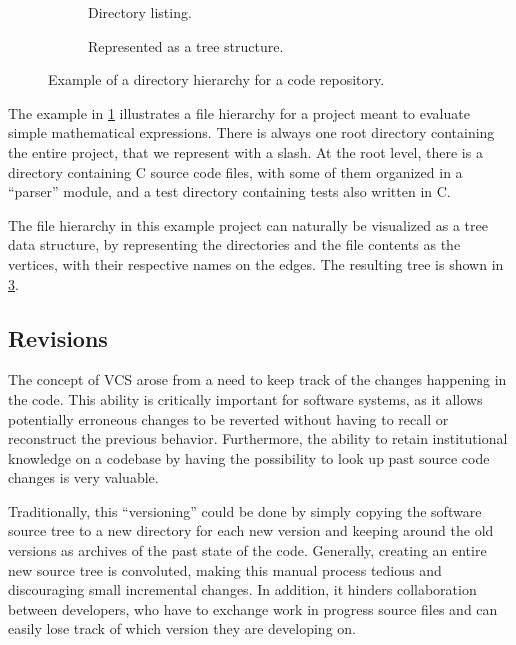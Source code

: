 \begin{figure}
    \centering
    \begin{subfigure}[b]{.40\textwidth}
        \caption{Directory listing.}
        \label{fig:vcs-dir-flat}
    \end{subfigure}\hfill
    \begin{subfigure}[b]{.58\textwidth}
        \centering
        
        \caption{Represented as a tree structure.}%
        \label{fig:vcs-dir-tree}
    \end{subfigure}
    \caption{Example of a directory hierarchy for a code repository.}
\end{figure}

The example in \cref{fig:vcs-dir-flat} illustrates a file hierarchy for a
project meant to evaluate simple mathematical expressions. There is always one
root directory containing the entire project, that we represent with a slash.
At the root level, there is a directory containing C source code files, with
some of them organized in a ``parser'' module, and a test directory containing
tests also written in C.

The file hierarchy in this example project can naturally be visualized as a
tree data structure, by representing the directories and the file contents as
the vertices, with their respective names on the edges. The resulting tree is
shown in \cref{fig:vcs-dir-tree}.

\subsection{Revisions}

The concept of \acrlong{VCS} arose from a need to keep track of the
changes happening in the code. This ability is critically important for
software systems, as it allows potentially erroneous changes to be reverted
without having to recall or reconstruct the previous behavior. Furthermore, the
ability to retain institutional knowledge on a codebase by having the
possibility to look up past source code changes is very valuable.

Traditionally, this ``versioning'' could be done by simply copying the software
source tree to a new directory for each new version and keeping around the old
versions as archives of the past state of the code. Generally, creating an
entire new source tree is convoluted, making this manual process tedious and
discouraging small incremental changes. In addition, it hinders collaboration
between developers, who have to exchange work in progress source files and can
easily lose track of which version they are developing on.

